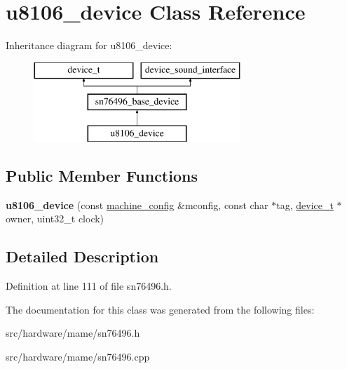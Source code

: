 \hypertarget{classu8106__device}{\section{u8106\-\_\-device Class Reference}
\label{classu8106__device}
}
Inheritance diagram for u8106\-\_\-device\-:\begin{figure}[H]
\begin{center}
\leavevmode
\includegraphics[height=3.000000cm]{classu8106__device}
\end{center}
\end{figure}
\subsection*{Public Member Functions}
\begin{DoxyCompactItemize}
\item 
\hypertarget{classu8106__device_a27e308267bd1877a226a24ecc479d08f}{{\bfseries u8106\-\_\-device} (const \hyperlink{structmachine__config}{machine\-\_\-config} \&mconfig, const char $\ast$tag, \hyperlink{classdevice__t}{device\-\_\-t} $\ast$owner, uint32\-\_\-t clock)}\label{classu8106__device_a27e308267bd1877a226a24ecc479d08f}

\end{DoxyCompactItemize}


\subsection{Detailed Description}


Definition at line 111 of file sn76496.\-h.



The documentation for this class was generated from the following files\-:\begin{DoxyCompactItemize}
\item 
src/hardware/mame/sn76496.\-h\item 
src/hardware/mame/sn76496.\-cpp\end{DoxyCompactItemize}
